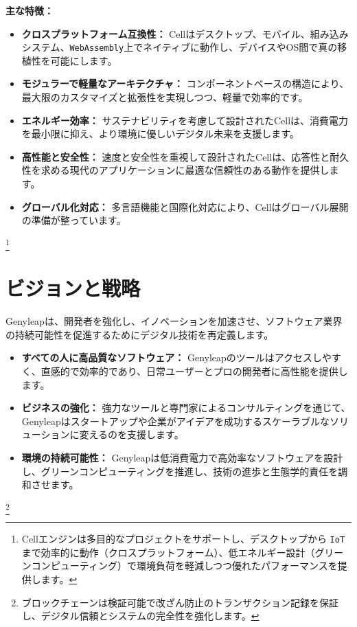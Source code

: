 \documentclass[a4paper,12pt,openany]{book}
\begin{document}
\textbf{主な特徴：}
\begin{itemize}
    \item \textbf{クロスプラットフォーム互換性：} Cellはデスクトップ、モバイル、組み込みシステム、\texttt{WebAssembly}上でネイティブに動作し、デバイスやOS間で真の移植性を可能にします。
    \item \textbf{モジュラーで軽量なアーキテクチャ：} コンポーネントベースの構造により、最大限のカスタマイズと拡張性を実現しつつ、軽量で効率的です。
    \item \textbf{エネルギー効率：} サステナビリティを考慮して設計されたCellは、消費電力を最小限に抑え、より環境に優しいデジタル未来を支援します。
    \item \textbf{高性能と安全性：} 速度と安全性を重視して設計されたCellは、応答性と耐久性を求める現代のアプリケーションに最適な信頼性のある動作を提供します。
    \item \textbf{グローバル化対応：} 多言語機能と国際化対応により、Cellはグローバル展開の準備が整っています。
\end{itemize}

\footnote{Cellエンジンは多目的なプロジェクトをサポートし、デスクトップから \texttt{IoT} まで効率的に動作（クロスプラットフォーム）、低エネルギー設計（グリーンコンピューティング）で環境負荷を軽減しつつ優れたパフォーマンスを提供します。}

\chapter{ビジョンと戦略}

Genyleapは、開発者を強化し、イノベーションを加速させ、ソフトウェア業界の持続可能性を促進するためにデジタル技術を再定義します。

\begin{itemize}
    \item \textbf{すべての人に高品質なソフトウェア：} Genyleapのツールはアクセスしやすく、直感的で効率的であり、日常ユーザーとプロの開発者に高性能を提供します。
    \item \textbf{ビジネスの強化：} 強力なツールと専門家によるコンサルティングを通じて、Genyleapはスタートアップや企業がアイデアを成功するスケーラブルなソリューションに変えるのを支援します。
    \item \textbf{環境の持続可能性：} Genyleapは低消費電力で高効率なソフトウェアを設計し、グリーンコンピューティングを推進し、技術の進歩と生態学的責任を調和させます。
\end{itemize}

\footnote{ブロックチェーンは検証可能で改ざん防止のトランザクション記録を保証し、デジタル信頼とシステムの完全性を強化します。}
\end{document}
